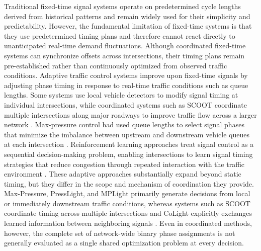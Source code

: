 Traditional fixed-time signal systems operate on predetermined cycle lengths derived from historical patterns and remain widely used for their simplicity and predictability. However, the fundamental limitation of fixed-time systems is that they use predetermined timing plans and therefore cannot react directly to unanticipated real-time demand fluctuations. Although coordinated fixed-time systems can synchronize offsets across intersections, their timing plans remain pre-established rather than continuously optimized from observed traffic conditions. Adaptive traffic control systems improve upon fixed-time signals by adjusting phase timing in response to real-time traffic conditions such as queue lengths. Some systems use local vehicle detectors to modify signal timing at individual intersections, while coordinated systems such as SCOOT coordinate multiple intersections along major roadways to improve traffic flow across a larger network \cite{hunt1981}. Max-pressure control had used queue lengths to select signal phases that minimize the imbalance between upstream and downstream vehicle queues at each intersection \cite{varaiya2013}. Reinforcement learning approaches treat signal control as a sequential decision-making problem, enabling intersections to learn signal timing strategies that reduce congestion through repeated interaction with the traffic environment \cite{agrahari2024}. These adaptive approaches substantially expand beyond static timing, but they
differ in the scope and mechanism of coordination they provide. Max-Pressure,
PressLight, and MPLight primarily generate decisions from local or immediately
downstream traffic conditions, whereas systems such as SCOOT coordinate timing across multiple
intersections and CoLight explicitly exchanges learned information between
neighboring signals \cite{hunt1981,wei2019presslight,chen2020mplight,wei2019colight}. Even in coordinated methods, however,
the complete set of network-wide binary phase assignments is not generally
evaluated as a single shared optimization problem at every decision.

